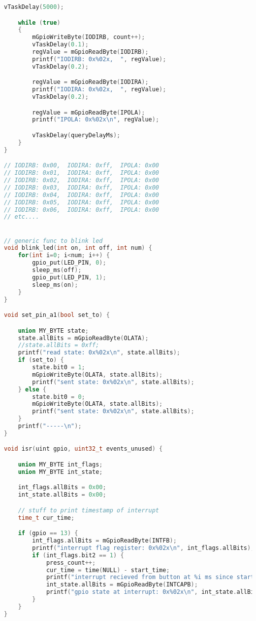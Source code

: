 \documentclass[sigconf]{article}
\begin{document}
\begin{lstlisting}[basicstyle=\footnotesize\ttfamily, language=c,breaklines]
    vTaskDelay(5000);

    while (true) 
    {
        mGpioWriteByte(IODIRB, count++);
        vTaskDelay(0.1);
        regValue = mGpioReadByte(IODIRB);
        printf("IODIRB: 0x%02x,  ", regValue);
        vTaskDelay(0.2);

        regValue = mGpioReadByte(IODIRA);
        printf("IODIRA: 0x%02x,  ", regValue);
        vTaskDelay(0.2);

        regValue = mGpioReadByte(IPOLA);
        printf("IPOLA: 0x%02x\n", regValue);

        vTaskDelay(queryDelayMs);
    }
}

// IODIRB: 0x00,  IODIRA: 0xff,  IPOLA: 0x00
// IODIRB: 0x01,  IODIRA: 0xff,  IPOLA: 0x00
// IODIRB: 0x02,  IODIRA: 0xff,  IPOLA: 0x00
// IODIRB: 0x03,  IODIRA: 0xff,  IPOLA: 0x00
// IODIRB: 0x04,  IODIRA: 0xff,  IPOLA: 0x00
// IODIRB: 0x05,  IODIRA: 0xff,  IPOLA: 0x00
// IODIRB: 0x06,  IODIRA: 0xff,  IPOLA: 0x00
// etc....


// generic func to blink led
void blink_led(int on, int off, int num) {
    for(int i=0; i<num; i++) {
        gpio_put(LED_PIN, 0);
        sleep_ms(off);
        gpio_put(LED_PIN, 1);
        sleep_ms(on);
    }
}

void set_pin_a1(bool set_to) {

    union MY_BYTE state;
    state.allBits = mGpioReadByte(OLATA);
    //state.allBits = 0xff;
    printf("read state: 0x%02x\n", state.allBits);
    if (set_to) {
        state.bit0 = 1;
        mGpioWriteByte(OLATA, state.allBits);
        printf("sent state: 0x%02x\n", state.allBits);
    } else {
        state.bit0 = 0;
        mGpioWriteByte(OLATA, state.allBits);
        printf("sent state: 0x%02x\n", state.allBits);
    }
    printf("-----\n");
}

void isr(uint gpio, uint32_t events_unused) {

    union MY_BYTE int_flags;
    union MY_BYTE int_state;

    int_flags.allBits = 0x00;
    int_state.allBits = 0x00;

    // stuff to print timestamp of interrupt
    time_t cur_time;

    if (gpio == 13) {
        int_flags.allBits = mGpioReadByte(INTFB);
        printf("interrupt flag register: 0x%02x\n", int_flags.allBits);
        if (int_flags.bit2 == 1) {
            press_count++;
            cur_time = time(NULL) - start_time;
            printf("interrupt recieved from button at %i ms since start\n", cur_time);
            int_state.allBits = mGpioReadByte(INTCAPB);
            printf("gpio state at interrupt: 0x%02x\n", int_state.allBits);
        }
    }
}


\end{lstlisting}
\end{document}
